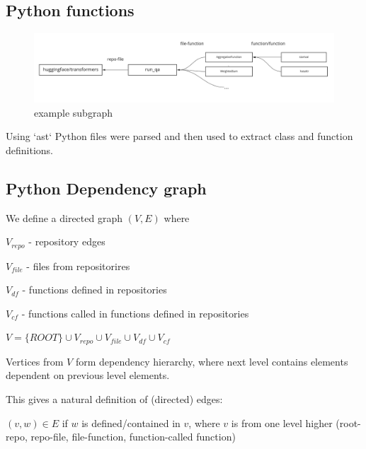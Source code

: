 \documentclass[11pt]{report}
\begin{document}
\subsection{Python functions}



\begin{center}
\begin{figure}[htbp]
\centering
\includegraphics[width=1.25\linewidth]{./img/graph_diagram.jpg}
\caption{example subgraph}
\end{figure}
\end{center}


Using `ast` Python files were parsed and then used to extract class and function definitions.



\subsection{Python Dependency graph}
\label{python-graph}



We define a directed graph  \((V, E)\) where 



\(V_{repo}\) - repository edges



\(V_{file}\) - files from repositorires 



\(V_{df}\) - functions defined in repositories



\(V_{cf}\) - functions called in functions defined in repositories



\(V = \{ROOT\} \cup V_{repo} \cup V_{file} \cup V_{df} \cup V_{cf}\)



Vertices from \(V\) form dependency hierarchy, where next level contains elements dependent on previous level elements.

This gives a natural definition of (directed) edges:

\((v, w) \in E\) if \(w\) is defined/contained in \(v\), where \(v\) is from one level higher (root-repo, repo-file, file-function, function-called function)
\end{document}
